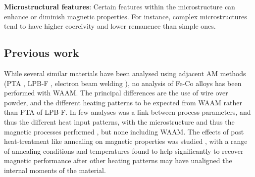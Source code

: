 \textbf{Microstructural features}: Certain features within the microstructure can enhance or diminish magnetic properties. For instance, complex microstructures tend to have higher coercivity and lower remanence than simple ones. \cite{Babasafari_Pan_Pahlevani_Kong_Du_Toit_Dippenaar_2021}







\subsection{Previous work}

While several similar materials have been analysed using adjacent AM methods (PTA \cite{Fu_Pan_Li_Wang_Zhao_Liu_Li_Zhu_2023}, LPB-F \cite{Riipinen_Metsä-Kortelainen_Lindroos_Keränen_Manninen_Pippuri-Mäkeläinen_2019} \cite{Gao}, electron beam welding \cite{Electron_Beam_Processing_of_Sensors_Relevant_Vacoflux-49_Alloy_2023}), no analysis of Fe-Co alloys has been performed with WAAM. The principal differences are the use of wire over powder, and the different heating patterns to be expected from WAAM rather than PTA of LPB-F. In few analyses was a link between process parameters, and thus the different heat input patterns, with the microstructure and thus the magnetic processes performed \cite{Gao} \cite{Willard_Franco_2013}, but none including WAAM. The effects of post heat-treatment like annealing on magnetic properties was studied \cite{Riipinen_Metsä-Kortelainen_Lindroos_Keränen_Manninen_Pippuri-Mäkeläinen_2019}, with a range of annealing conditions and temperatures found to help significantly to recover magnetic performance after other heating patterns may have unaligned the internal moments of the material.

